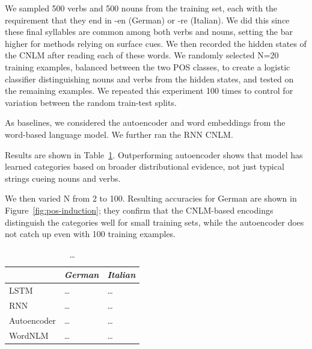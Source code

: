We sampled 500 verbs and 500 nouns from the training set, each with the requirement that they end in -en (German) or -re (Italian).
We did this since these final syllables are common among both verbs and nouns, setting the bar higher for methods relying on surface cues.
We then recorded the hidden states of the CNLM after reading each of these words.
We randomly selected N=20 training examples, balanced between the two POS classes, to create a logistic classifier distinguishing nouns and verbs from the hidden states, and tested on the remaining examples.
We repeated this experiment 100 times to control for variation between the random train-test splits.

As baselines, we considered the autoencoder and word embeddings from the word-based language model.
We further ran the RNN CNLM.

Results are shown in Table~\ref{tab:pos-results}.
Outperforming autoencoder shows that model has learned categories based on broader distributional evidence, not just typical strings cueing nouns and verbs.


We then varied N from 2 to 100.
Resulting accuracies for German are shown in Figure~\ref{fig:pos-induction}; they confirm that the CNLM-based encodings distinguish the categories well for small training sets, while the autoencoder does not catch up even with 100 training examples.




\begin{table}[t]
  \begin{center}
    \begin{tabular}{l|l|l}
      \multicolumn{1}{c}{}&\emph{German}&\emph{Italian}\\
      \hline
      LSTM&\ldots&\ldots\\
      RNN&\ldots&\ldots\\
      Autoencoder&\ldots&\ldots\\
      WordNLM&\ldots&\ldots\\
    \end{tabular}
  \end{center}
  \caption{\label{tab:pos-results} \ldots}
\end{table}


